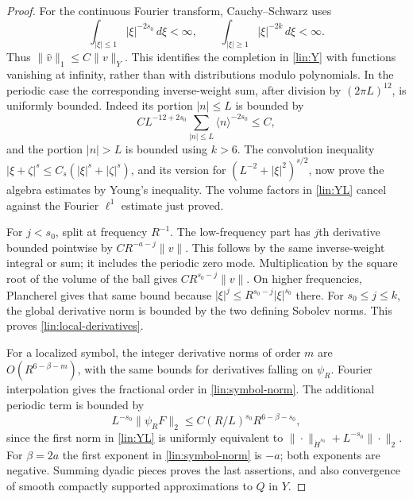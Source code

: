 \begin{proof}
For the continuous Fourier transform, Cauchy--Schwarz uses
\[
 \int_{|\xi|\le1}|\xi|^{-2s_0}\,d\xi<\infty,
 \qquad
 \int_{|\xi|\ge1}|\xi|^{-2k}\,d\xi<\infty.
\]
Thus $\|\widehat v\|_1\le C\|v\|_Y$.  This identifies the completion in
\eqref{lin:Y} with functions vanishing at infinity, rather than with
distributions modulo polynomials.  In the periodic case the corresponding
inverse-weight sum, after division by $(2\pi L)^{12}$, is uniformly
bounded.  Indeed its portion $|n|\le L$ is bounded by
\[
 C L^{-12+2s_0}\sum_{|n|\le L}\langle n\rangle^{-2s_0}\le C,
\]
and the portion $|n|>L$ is bounded using $k>6$.
The convolution inequality
$|\xi+\zeta|^s\le C_s(|\xi|^s+|\zeta|^s)$, and its version for
$(L^{-2}+|\xi|^2)^{s/2}$, now prove the algebra estimates by Young's
inequality.  The volume factors in \eqref{lin:YL} cancel against the
Fourier $\ell^1$ estimate just proved.

For $j<s_0$, split at frequency $R^{-1}$.  The low-frequency part has
$j$th derivative bounded pointwise by $CR^{-a-j}\|v\|$.  This follows
by the same inverse-weight integral or sum; it includes the periodic
zero mode.  Multiplication by the square root of the volume of the
ball gives $CR^{s_0-j}\|v\|$.  On higher frequencies, Plancherel gives
that same bound because
$|\xi|^j\le R^{s_0-j}|\xi|^{s_0}$ there.  For $s_0\le j\le k$,
the global derivative norm is bounded by the two defining Sobolev
norms.  This proves \eqref{lin:local-derivatives}.

For a localized symbol, the integer derivative norms of order $m$ are
$O(R^{6-\beta-m})$, with the same bounds for derivatives falling on
$\psi_R$.  Fourier interpolation gives the fractional order in
\eqref{lin:symbol-norm}.  The additional periodic term is bounded by
\[
 L^{-s_0}\|\psi_RF\|_2
 \le C(R/L)^{s_0}R^{6-\beta-s_0},
\]
since the first norm in \eqref{lin:YL} is uniformly equivalent to
$\|\cdot\|_{\dot H^{s_0}}+L^{-s_0}\|\cdot\|_2$.
For $\beta=2a$ the first exponent in \eqref{lin:symbol-norm} is $-a$;
both exponents are negative.  Summing dyadic pieces proves the last
assertions, and also convergence of smooth compactly supported
approximations to $Q$ in $Y$.
\end{proof}

